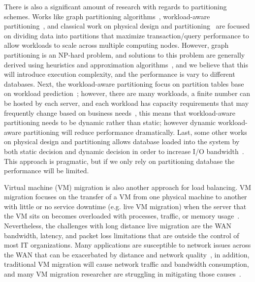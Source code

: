 There is also a significant amount of research with regards to partitioning schemes. Works like graph partitioning algorithms~\cite{Karypis:1998:FHQ:305219.305248}, workload-aware partitioning~\cite{Scholl:2009:WDP:1516360.1516366}, and classical work on physical design and partitioning~\cite{Zilio:1998:PDD:928651} are focused on dividing data into partitions that maximize transaction/query performance to allow workloads to scale across multiple computing nodes. However, graph partitioning is an NP-hard problem, and solutions to this problem are generally derived using heuristics and approximation algorithms~\cite{citeulike:11192678}, and we believe that this will introduce execution complexity, and the performance is vary to different databases. Next, the workload-aware partitioning focus on partition tables base on workload prediction~\cite{Scholl:2009:WDP:1516360.1516366, Mit-Shinobi}; however, there are many workloads, a ﬁnite number can be hosted by each server, and each workload has capacity requirements that may frequently change based on business needs~\cite{Gmach:2007:WAD:1524302.1524818}, this means that workload-aware partitioning needs to be dynamic rather than static; however dynamic workload-aware partitioning will reduce performance dramatically. Last, some other works on physical design and partitioning allows database loaded into the system by both static decision and dynamic decision in order to increase I/O bandwidth~\cite{Zilio:1998:PDD:928651}. This approach is pragmatic, but if we only rely on partitioning database the performance will be limited.
 
Virtual machine (VM) migration is also another approach for load balancing. VM migration focuses on the transfer of a VM from one physical machine to another with little or no service downtime (e.g. live VM migration) when the server that the VM sits on becomes overloaded with processes, traffic, or memory usage~\cite{Clark:2005:LMV:1251203.1251223}. Nevertheless, the challenges with long distance live migration are the WAN bandwidth, latency, and packet loss limitations that are outside the control of most IT organizations. Many applications are susceptible to network issues across the WAN that can be exacerbated by distance and network quality~\cite{murphyVMWare}, in addition, traditional VM migration will cause network traffic and bandwidth consumption, and many VM migration researcher are struggling in mitigating those causes~\cite{Liu:2009:LMV:1551609.1551630}.
